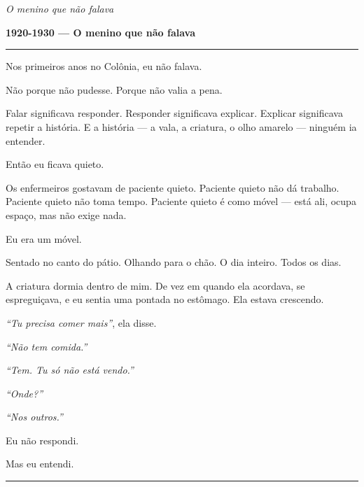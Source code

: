 
\noindent \textit{O menino que não falava}

\noindent \textbf{1920-1930 --- O menino que não falava}

\vspace{0.5em}\noindent\rule{\textwidth}{0.5pt}\vspace{0.5em}

\noindent Nos primeiros anos no Colônia, eu não falava.

\noindent Não porque não pudesse. Porque não valia a pena.

\noindent Falar significava responder. Responder significava explicar. Explicar significava repetir a história. E a história --- a vala, a criatura, o olho amarelo --- ninguém ia entender.

\noindent Então eu ficava quieto.

\noindent Os enfermeiros gostavam de paciente quieto. Paciente quieto não dá trabalho. Paciente quieto não toma tempo. Paciente quieto é como móvel --- está ali, ocupa espaço, mas não exige nada.

\noindent Eu era um móvel.

\noindent Sentado no canto do pátio. Olhando para o chão. O dia inteiro. Todos os dias.

\noindent A criatura dormia dentro de mim. De vez em quando ela acordava, se espreguiçava, e eu sentia uma pontada no estômago. Ela estava crescendo.

\noindent \textit{\textquotedblleft{}Tu precisa comer mais\textquotedblright{}}, ela disse.

\noindent \textit{\textquotedblleft{}Não tem comida.\textquotedblright{}}

\noindent \textit{\textquotedblleft{}Tem. Tu só não está vendo.\textquotedblright{}}

\noindent \textit{\textquotedblleft{}Onde?\textquotedblright{}}

\noindent \textit{\textquotedblleft{}Nos outros.\textquotedblright{}}

\noindent Eu não respondi.

\noindent Mas eu entendi.

\vspace{0.5em}\noindent\rule{\textwidth}{0.5pt}\vspace{0.5em}

